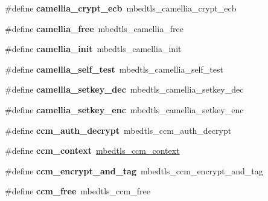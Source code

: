 \begin{DoxyCompactItemize}
\#define {\bfseries camellia\+\_\+crypt\+\_\+ecb}~mbedtls\+\_\+camellia\+\_\+crypt\+\_\+ecb
\item 
\mbox{\label{compat-1_83_8h_a48d6af2d2cf9dad0849f06a4cbac8723}} 
\#define {\bfseries camellia\+\_\+free}~mbedtls\+\_\+camellia\+\_\+free
\item 
\mbox{\label{compat-1_83_8h_abbd4cea0d122ee5d8aab1dbc930e317c}} 
\#define {\bfseries camellia\+\_\+init}~mbedtls\+\_\+camellia\+\_\+init
\item 
\mbox{\label{compat-1_83_8h_a5aaea3248fdbc92e7a8a5920b9cde299}} 
\#define {\bfseries camellia\+\_\+self\+\_\+test}~mbedtls\+\_\+camellia\+\_\+self\+\_\+test
\item 
\mbox{\label{compat-1_83_8h_a8fc022667ab8f27ff4e91fa5fba8ce89}} 
\#define {\bfseries camellia\+\_\+setkey\+\_\+dec}~mbedtls\+\_\+camellia\+\_\+setkey\+\_\+dec
\item 
\mbox{\label{compat-1_83_8h_aebc581aaf8cb7f8eeaced20d3dac0cdf}} 
\#define {\bfseries camellia\+\_\+setkey\+\_\+enc}~mbedtls\+\_\+camellia\+\_\+setkey\+\_\+enc
\item 
\mbox{\label{compat-1_83_8h_ae060fa35b5593a8369dde4b76816e905}} 
\#define {\bfseries ccm\+\_\+auth\+\_\+decrypt}~mbedtls\+\_\+ccm\+\_\+auth\+\_\+decrypt
\item 
\mbox{\label{compat-1_83_8h_a32163b6be4644639caeebd795da3f1c7}} 
\#define {\bfseries ccm\+\_\+context}~\mbox{\hyperlink{structmbedtls__ccm__context}{mbedtls\+\_\+ccm\+\_\+context}}
\item 
\mbox{\label{compat-1_83_8h_a2ab6ac45d170fd011b6bcbf831ca3096}} 
\#define {\bfseries ccm\+\_\+encrypt\+\_\+and\+\_\+tag}~mbedtls\+\_\+ccm\+\_\+encrypt\+\_\+and\+\_\+tag
\item 
\mbox{\label{compat-1_83_8h_ad05a53b9a3ba72b556a36106ff647484}} 
\#define {\bfseries ccm\+\_\+free}~mbedtls\+\_\+ccm\+\_\+free
\item 
\mbox{\label{compat-1_83_8h_ada88cb9aeba11f0c97f2d1ea9705622c}} 

\end{DoxyCompactItemize}
